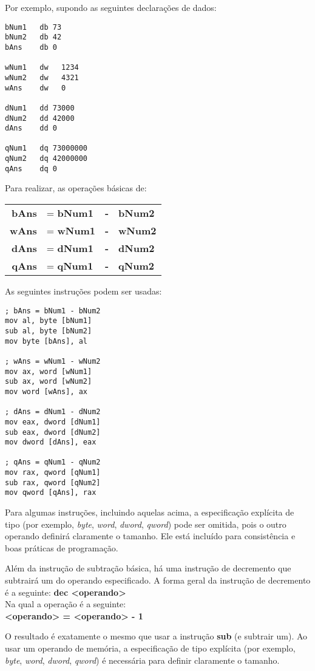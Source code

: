 Por exemplo, supondo as seguintes declarações de dados:
\begin{lstlisting}
bNum1   db 73
bNum2   db 42
bAns    db 0

wNum1   dw   1234
wNum2   dw   4321
wAns    dw   0

dNum1   dd 73000
dNum2   dd 42000
dAns    dd 0

qNum1   dq 73000000
qNum2   dq 42000000
qAns    dq 0
\end{lstlisting}

Para realizar, as operações básicas de:\\
\begin{tabular}{rlcl}
	\textbf{bAns} & = \textbf{bNum1} &\textbf{-}& \textbf{bNum2}\\
	\textbf{wAns} & = \textbf{wNum1} &\textbf{-}& \textbf{wNum2}\\
	\textbf{dAns} & = \textbf{dNum1} &\textbf{-}& \textbf{dNum2}\\
	\textbf{qAns} & = \textbf{qNum1} &\textbf{-}& \textbf{qNum2}\\
\end{tabular}

As seguintes instruções podem ser usadas:
\begin{lstlisting}
; bAns = bNum1 - bNum2
mov al, byte [bNum1]
sub al, byte [bNum2]
mov byte [bAns], al

; wAns = wNum1 - wNum2
mov ax, word [wNum1]
sub ax, word [wNum2]
mov word [wAns], ax

; dAns = dNum1 - dNum2
mov eax, dword [dNum1]
sub eax, dword [dNum2]
mov dword [dAns], eax

; qAns = qNum1 - qNum2
mov rax, qword [qNum1]
sub rax, qword [qNum2]
mov qword [qAns], rax
\end{lstlisting}

Para algumas instruções, incluindo aquelas acima, a especificação explícita de tipo  (por exemplo, \textit{byte}, \textit{word}, \textit{dword}, \textit{qword}) pode ser omitida, pois o outro operando definirá claramente o tamanho. Ele está incluído para consistência e boas práticas de programação.

Além da instrução de subtração básica, há uma instrução de decremento que subtrairá um do operando especificado. A forma geral da instrução de decremento é a seguinte:
\textbf{dec <operando>}\\
Na qual a operação é a seguinte:\\
\textbf{<operando> = <operando> - 1}

O resultado é exatamente o mesmo que usar a instrução \textbf{sub} (e subtrair um). Ao usar um operando de memória, a especificação de tipo explícita (por exemplo, \textit{byte}, \textit{word}, \textit{dword}, \textit{qword}) é necessária para definir claramente o tamanho.

